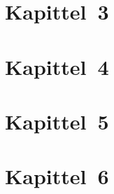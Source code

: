 \section*{Kapittel~3}

\section*{Kapittel~4}

\section*{Kapittel~5}

\section*{Kapittel~6}

% 
% 
% 
% 
% 
% 
% 
% 
% 


